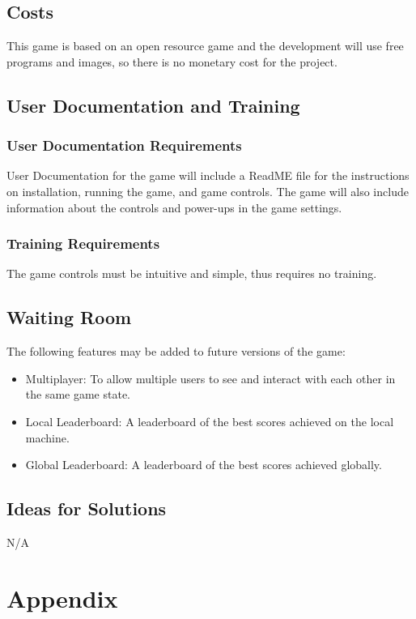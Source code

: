 \documentclass[12pt, titlepage]{article}
\begin{document}
\subsection{Costs}
This game is based on an open resource game and the development will use free programs and images, so there is no monetary cost for the project.

\subsection{User Documentation and Training}
\subsubsection{User Documentation Requirements}
User Documentation for the game will include a ReadME file for the instructions on installation, running the game, and game controls. The game will also include information about the controls and power-ups in the game settings. 

\subsubsection{Training Requirements}
The game controls must be intuitive and simple, thus requires no training.

\subsection{Waiting Room}
The following features may be added to future versions of the game:
\begin{itemize}
    \item Multiplayer: To allow multiple users to see and interact with each other in the same game state.
    \item Local Leaderboard: A leaderboard of the best scores achieved on the local machine.
    \item Global Leaderboard: A leaderboard of the best scores achieved globally. 
\end{itemize}

\subsection{Ideas for Solutions}
N/A





\newpage

\section{Appendix}
\end{document}
